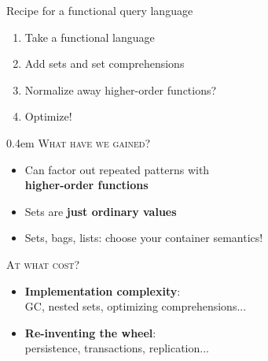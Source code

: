 \documentclass[xcolor=table,usenames,dvipsnames,svgnames]{beamer}
\begin{document}

\begin{frame}{Recipe for a functional query language}\Large

  \begin{enumerate}\itemsep 1.5em
  \item Take a functional language
  \item Add sets and set comprehensions
  \item Normalize away higher-order functions?
  \item Optimize!
  \end{enumerate}
\end{frame}


\begin{frame}{}\large\parskip 0.4em
  \textsc{What have we gained?}
  \begin{itemize}\itemsep 0.5em
  \item Can factor out repeated patterns with\\ \textbf{higher-order functions}
  \item Sets are \textbf{just ordinary values}
  \item Sets, bags, lists: choose your container semantics!
  \end{itemize}

  \vspace{1em}\pause

  \textsc{At what cost?}
  \begin{itemize}
  \item \textbf{Implementation complexity}:\\
    {\small GC, nested sets, optimizing comprehensions...}
  \item \textbf{Re-inventing the wheel}:\\
    {\small persistence, transactions, replication...}
  \end{itemize}

\end{frame}
\end{document}
